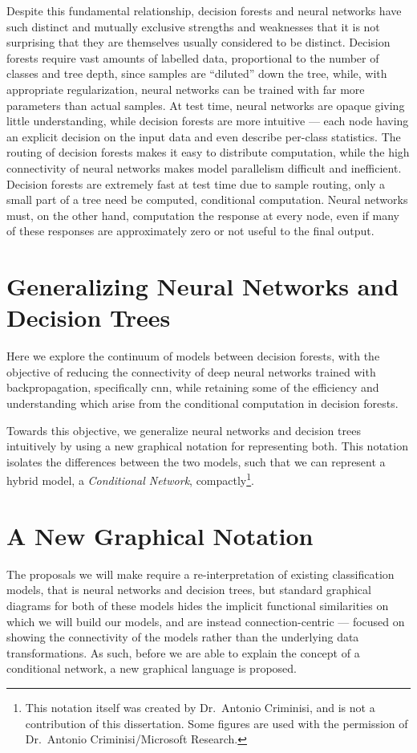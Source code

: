 \documentclass[thesis]{subfiles}
\begin{document}
	Despite this fundamental relationship, decision forests and neural networks have such distinct and mutually exclusive strengths and weaknesses that it is not surprising that they are themselves usually considered to be distinct. Decision forests require vast amounts of labelled data, proportional to the number of classes and tree depth, since samples are ``diluted'' down the tree, while, with appropriate regularization, neural networks can be trained with far more parameters than actual samples. At test time, neural networks are opaque giving little understanding, while decision forests are more intuitive --- each node having an explicit decision on the input data and even describe per-class statistics. The routing of decision forests makes it easy to distribute computation, while the high connectivity of neural networks makes model parallelism difficult and inefficient. Decision forests are extremely fast at test time due to sample routing, only a small part of a tree need be computed, \ie conditional computation. Neural networks must, on the other hand, computation the response at every node, even if many of these responses are approximately zero or not useful to the final output.
	
	\section{Generalizing Neural Networks and Decision Trees}
	Here we explore the continuum of models between decision forests, with the objective of reducing the connectivity of deep neural networks trained with backpropagation, specifically \gls{cnn}, while retaining some of the efficiency and understanding which arise from the conditional computation in decision forests.
	
	Towards this objective, we generalize neural networks and decision trees intuitively by using a new graphical notation for representing both. This notation isolates the differences between the two models, such that we can represent a hybrid model, \ie a \emph{Conditional Network}, compactly\footnote{This notation itself was created by Dr.\ Antonio Criminisi, and is not a contribution of this dissertation. Some figures are used with the permission of Dr.\ Antonio Criminisi/Microsoft Research.}.
	
	\section{A New Graphical Notation}
	The proposals we will make require a re-interpretation of existing classification models, that is neural networks and decision trees, but standard graphical diagrams for both of these models hides the implicit functional similarities on which we will build our models, and are instead connection-centric --- focused on showing the connectivity of the models rather than the underlying data transformations. As such, before we are able to explain the concept of a conditional network, a new graphical language is proposed.
	
\end{document}

